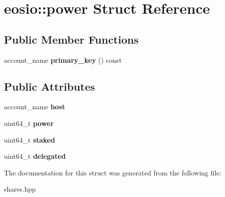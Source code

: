 \hypertarget{structeosio_1_1power}{}\section{eosio\+:\+:power Struct Reference}
\label{structeosio_1_1power}
\subsection*{Public Member Functions}
\begin{DoxyCompactItemize}
\item 
\mbox{\label{structeosio_1_1power_a6240f6bae84f93864b703f4f1717ef78}} 
account\+\_\+name {\bfseries primary\+\_\+key} () const
\end{DoxyCompactItemize}
\subsection*{Public Attributes}
\begin{DoxyCompactItemize}
\item 
\mbox{\label{structeosio_1_1power_a8c4403d2112092d882d80fd6004b2f4a}} 
account\+\_\+name {\bfseries host}
\item 
\mbox{\label{structeosio_1_1power_a0c26e9e5577f7e3af649db52cd638c18}} 
uint64\+\_\+t {\bfseries power}
\item 
\mbox{\label{structeosio_1_1power_ac1f0046b92518f5f9672437dc6fed102}} 
uint64\+\_\+t {\bfseries staked}
\item 
\mbox{\label{structeosio_1_1power_a16fb448f234f44fa95ff731f44e52d36}} 
uint64\+\_\+t {\bfseries delegated}
\end{DoxyCompactItemize}


The documentation for this struct was generated from the following file\+:\begin{DoxyCompactItemize}
\item 
shares.\+hpp\end{DoxyCompactItemize}
